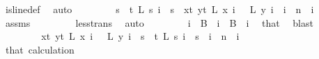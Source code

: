 \begin{isabellebody}
\ is{\isacharunderscore}{\kern0pt}line{\isacharunderscore}{\kern0pt}def\ \isamarkupfalse%
\ auto\isanewline
\isanewline
\ \ \isacommand{{\isacharbraceleft}{\kern0pt}}\isamarkupfalse%
\isanewline
\ \ \ \ \isamarkupfalse%
\ {\isachardoublequoteopen}{\isacharparenleft}{\kern0pt}{\isasymforall}s\ {\isacharless}{\kern0pt}\ t{\isachardot}{\kern0pt}\ L\ s\ i\ {\isacharequal}{\kern0pt}\ s{\isacharparenright}{\kern0pt}\ {\isasymlongrightarrow}\ {\isasymnot}{\isacharparenleft}{\kern0pt}{\isasymforall}x{\isacharless}{\kern0pt}t{\isachardot}{\kern0pt}\ {\isasymforall}y{\isacharless}{\kern0pt}t{\isachardot}{\kern0pt}\ L\ x\ i\ {\isacharequal}{\kern0pt}\ \ L\ y\ i{\isacharparenright}{\kern0pt}{\isachardoublequoteclose}\ \ {\isachardoublequoteopen}i\ {\isacharless}{\kern0pt}\ n{\isachardoublequoteclose}\ \ i\ \isamarkupfalse%
\ assms{\isacharparenleft}{\kern0pt}{}{\isacharparenright}{\kern0pt}\ \isanewline
\ \ \ \ \ \ \isamarkupfalse%
\ less{\isacharunderscore}{\kern0pt}trans\ \isamarkupfalse%
\ auto\ \isanewline
\ \ \ \ \isamarkupfalse%
\ \isamarkupfalse%
\ {\isacharasterisk}{\kern0pt}{\isacharcolon}{\kern0pt}{\isachardoublequoteopen}i\ {\isasymnotin}\ {\isacharquery}{\kern0pt}B{}{\isachardoublequoteclose}\ \ {\isachardoublequoteopen}i\ {\isasymin}\ {\isacharquery}{\kern0pt}B{}{\isachardoublequoteclose}\ \ i\ \isamarkupfalse%
\ that\ \isamarkupfalse%
\ blast\isanewline
\ \ \isacommand{{\isacharbraceright}{\kern0pt}}\isamarkupfalse%
\isanewline
\ \ \isamarkupfalse%
\isanewline
\ \ \isacommand{{\isacharbraceleft}{\kern0pt}}\isamarkupfalse%
\isanewline
\ \ \ \ \isamarkupfalse%
\ {\isachardoublequoteopen}{\isacharparenleft}{\kern0pt}{\isasymforall}x{\isacharless}{\kern0pt}t{\isachardot}{\kern0pt}\ {\isasymforall}y{\isacharless}{\kern0pt}t{\isachardot}{\kern0pt}\ L\ x\ i\ {\isacharequal}{\kern0pt}\ \ L\ y\ i{\isacharparenright}{\kern0pt}\ {\isasymlongrightarrow}\ {\isasymnot}{\isacharparenleft}{\kern0pt}{\isasymforall}s\ {\isacharless}{\kern0pt}\ t{\isachardot}{\kern0pt}\ L\ s\ i\ {\isacharequal}{\kern0pt}\ s{\isacharparenright}{\kern0pt}{\isachardoublequoteclose}\ \ {\isachardoublequoteopen}i\ {\isacharless}{\kern0pt}\ n{\isachardoublequoteclose}\ \ i\isanewline
\ \ \ \ \ \ \isamarkupfalse%
\ that\ calculation\ \isamarkupfalse%

\end{isabellebody}
